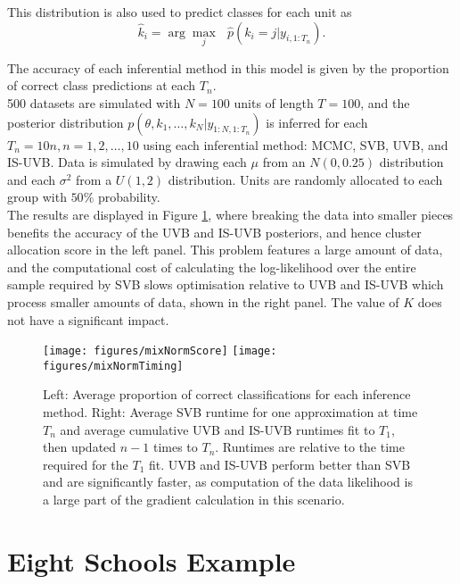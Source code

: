 \documentclass[12pt,a4paper]{article}\usepackage[]{graphicx}\usepackage[]{color}
\begin{document}
This distribution is also used to predict classes for each unit as
\begin{equation}
\hat{k}_i = \arg \underset{j}{\max}\mbox{ } \hat{p}(k_i = j | y_{i, 1:T_n}).
\end{equation}

The accuracy of each inferential method in this model is given by the proportion of correct class predictions at each $T_n$.
\\

500 datasets are simulated with $N = 100$ units of length $T = 100$, and the posterior distribution $p(\theta, k_1, \ldots, k_N | y_{1:N, 1:T_n})$ is inferred for each $T_n = 10n, n = 1, 2, \ldots, 10$ using each inferential method: MCMC, SVB, UVB, and IS-UVB. Data is simulated by drawing each $\mu$ from an $N(0, 0.25)$ distribution and each $\sigma^2$ from a $U(1, 2)$ distribution. Units are randomly allocated to each group with $50\%$ probability. 
\\

The results are displayed in Figure \ref{fig:UVBMMCResults}, where breaking the data into smaller pieces benefits the accuracy of the UVB and IS-UVB posteriors, and hence cluster allocation score in the left panel. This problem features a large amount of data, and the computational cost of calculating the log-likelihood over the entire sample required by SVB slows optimisation relative to UVB and IS-UVB which process smaller amounts of data, shown in the right panel. The value of $K$ does not have a significant impact.

\begin{figure}[htbp]
    \centering
    {{\texttt{[image: figures/mixNormScore]} }}%
    \qquad
    {{\texttt{[image: figures/mixNormTiming]} }}%
    \caption{Left: Average proportion of correct classifications for each inference method. Right: Average SVB runtime for one approximation at time $T_n$ and average cumulative UVB and IS-UVB runtimes fit to $T_1$, then updated $n-1$ times to $T_n$. Runtimes are relative to the time required for the $T_1$ fit.    
UVB and IS-UVB perform better than SVB and are significantly faster, as computation of the data likelihood is a large part of the gradient calculation in this scenario.}%
    \label{fig:UVBMMCResults}%
\end{figure}

\section{Eight Schools Example}
\end{document}
